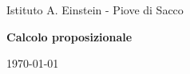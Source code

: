 \begin{titlepage}
    \begin{center}
        \vspace*{1cm}
        
        \LARGE
        Istituto A. Einstein - Piove di Sacco
        
        \vspace{1.5cm}
        
        \Huge
        \textbf{Calcolo proposizionale}
        
        \vspace{1.5cm}
                    
        \LARGE
        \today
            
        \vfill
        
    \end{center}
\end{titlepage}